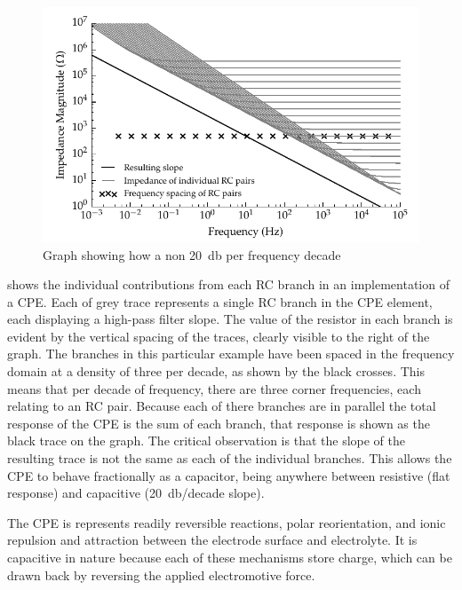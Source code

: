       \begin{figure}
        \centering
        \includegraphics{content/pt2/07-InterfaceModel/graphics/graph_cpe_creation}
        \caption{\label{graph:pt2-cpe_creation}Graph showing how a non \SI{20}{\decibel} per frequency decade}
      \end{figure}

       shows the individual contributions from each RC branch in an implementation of a CPE.
      Each of grey trace represents a single RC branch in the CPE element, each displaying a high-pass filter slope.
      The value of the resistor in each branch is evident by the vertical spacing of the traces, clearly visible to the right of the graph.
      The branches in this particular example have been spaced in the frequency domain at a density of three per decade, as shown by the black crosses.
      This means that per decade of frequency, there are three corner frequencies, each relating to an RC pair.
      Because each of there branches are in parallel the total response of the CPE is the sum of each branch, that response is shown as the black trace on the graph.
      The critical observation is that the slope of the resulting trace is not the same as each of the individual branches.
      This allows the CPE to behave fractionally as a capacitor, being anywhere between resistive (flat response) and capacitive (\SI{20}{\decibel}/decade slope).

      The CPE is represents readily reversible reactions, polar reorientation, and ionic repulsion and attraction between the electrode surface and electrolyte.
      It is capacitive in nature because each of these mechanisms store charge, which can be drawn back by reversing the applied electromotive force.


